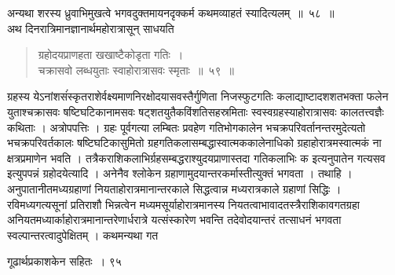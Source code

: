 \documentclass[11pt, openany]{book}
\begin{document}
\begin{sloppypar}
\noindent अन्यथा शरस्य ध्रुवाभिमुखत्वे भगवदुक्तमायनदृक्कर्म कथमव्याहतं स्यादित्यलम्~॥~५८~॥\\
\noindent अथ दिनरात्रिमानज्ञानार्थमहोरात्रासून् साधयति\textendash
\end{sloppypar}
\begin{quote}

{\ssi ग्रहोदयप्राणहता खखाष्टैकोडृता गतिः~।\\
चक्रासवो लब्धयुताः स्वाहोरात्रासवः स्मृताः~॥~५९~॥}
\end{quote}
\begin{sloppypar}
ग्रहस्य येऽनांशसंंस्कृतराशेर्वक्ष्यमाणनिरक्षोदयासवस्तैर्गुणिता निजस्फुटगतिः कलाद्याष्टादशशतभक्ता फलेन युताश्चक्रासवः षष्टिघटिकानामसवः षट्शतयुतैकविंशतिसहस्रमिताः स्वस्वग्रहस्याहोरात्रासवः कालतत्त्वज्ञैः कथिताः । अत्रोपपत्तिः । ग्रहः पूर्वगत्या लम्बितः प्रवहेण गतिभोगकालेन भचक्रपरिवर्तानन्तरमुदेत्यतो भचक्रपरिवर्तकालः षष्टिघटिकासुमितो ग्रहगतिकलासम्बद्धास्वात्मककालेनाधिको ग्रहाहोरात्रमस्वात्मकं ना क्षत्रप्रमाणेन भवति । तत्रैकराशिकलाभिर्ग्रहसम्बद्धराश्युदयप्राणास्तदा गतिकलाभिः क इत्यनुपातेन गत्यसव इत्युपपन्नं ग्रहोदयेत्यादि । अनेनैव श्लोकेन ग्रहाणामुदयान्तरकर्मास्तीत्युक्तं भगवता । तथाहि । अनुपातानीतमध्यग्रहाणां नियताहोरात्रमानान्तरकाले सिद्धत्वान्न मध्यरात्रकाले ग्रहाणां सिद्धिः । रविमध्यगत्यसूनां प्रतिराशौ भिन्नत्वेन मध्यमसूर्याहोरात्रमानस्य नियतत्वाभावादतस्त्रैराशिकावगतग्रहा अनियतमध्यार्काहोरात्रमानान्तरेणार्धरात्रे यत्संस्कारेण भवन्ति तदेवोदयान्तरं तत्साधनं भगवता स्वल्पान्तरत्वादुपेक्षितम् । कथमन्यथा गत\textendash
\end{sloppypar}

\newpage

\hspace{3cm}गूढार्थप्रकाशकेन सहितः~। \hfill ९५
\vspace{1cm}
\end{document}
